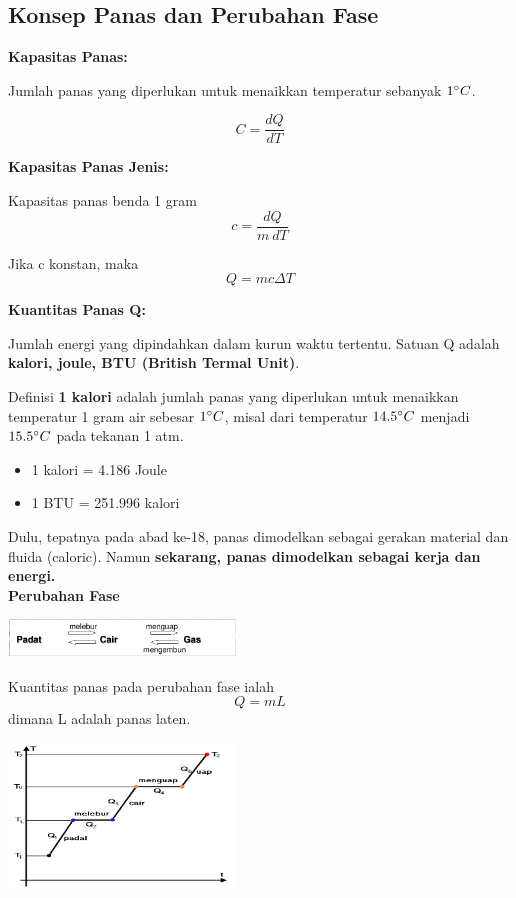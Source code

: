 \documentclass[twocolumn, 11pt]{article}%
\begin{document}
        \subsection{Konsep Panas dan Perubahan Fase}
        \textbf{Kapasitas Panas:}

        Jumlah panas yang diperlukan untuk menaikkan temperatur sebanyak $1\degree C$.

        \[ C = \frac{dQ}{dT} \]

        \textbf{Kapasitas Panas Jenis:}
        
        Kapasitas panas benda 1 gram
        \[c= \frac{dQ}{m\ dT} \]

        Jika c konstan, maka
        \[ Q=mc \Delta T \]

        \textbf{Kuantitas Panas Q:}

        Jumlah energi yang dipindahkan dalam kurun waktu tertentu. Satuan Q adalah \textbf{kalori, joule, BTU (British Termal Unit)}.

        Definisi \textbf{1 kalori} adalah jumlah panas yang diperlukan untuk menaikkan temperatur 1 gram air sebesar $1\degree C$, misal dari temperatur $14.5\degree C$ menjadi $15.5\degree C$ pada tekanan 1 atm.

        \begin{itemize}
                \item 1 kalori = 4.186 Joule
                \item 1 BTU = 251.996 kalori
        \end{itemize}

        Dulu, tepatnya pada abad ke-18, panas dimodelkan sebagai gerakan material dan fluida (caloric). Namun \textbf{sekarang, panas dimodelkan sebagai kerja dan energi.}\\
        
        \textbf{Perubahan Fase}

        \begin{center}
            \includegraphics[width=230px]{5.png}
        \end{center}

        Kuantitas panas pada perubahan fase ialah
        \[ Q=mL \]
        dimana L adalah panas laten.
        \begin{center}
            \includegraphics[width=230px]{6.png}
        \end{center}
\end{document}
